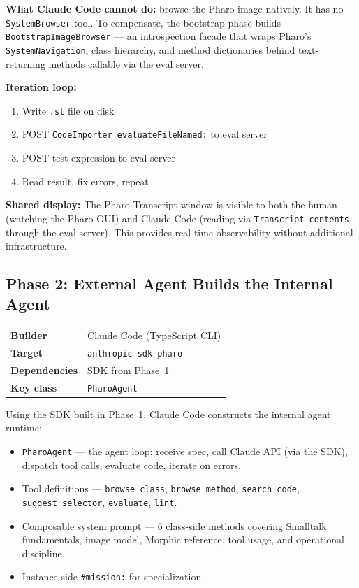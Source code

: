 \documentclass[a4paper,10pt,fleqn]{article}
\newcommand{\cls}[1]{\texttt{#1}}
\newcommand{\sel}[1]{\texttt{\##1}}
\begin{document}
\textbf{What Claude Code cannot do:} browse the Pharo image natively.
It has no \texttt{SystemBrowser} tool.  To compensate, the bootstrap
phase builds \cls{BootstrapImageBrowser} --- an introspection facade that
wraps Pharo's \texttt{SystemNavigation}, class hierarchy, and method
dictionaries behind text-returning methods callable via the eval server.

\textbf{Iteration loop:}
\begin{enumerate}
  \item Write \texttt{.st} file on disk
  \item POST \texttt{CodeImporter evaluateFileNamed:} to eval server
  \item POST test expression to eval server
  \item Read result, fix errors, repeat
\end{enumerate}

\textbf{Shared display:} The Pharo Transcript window is visible to
both the human (watching the Pharo GUI) and Claude Code (reading via
\texttt{Transcript contents} through the eval server).  This provides
real-time observability without additional infrastructure.

\subsection{Phase 2: External Agent Builds the Internal Agent}

\begin{center}
\begin{tabularx}{\linewidth}{@{}lY@{}}
\toprule
\textbf{Builder} & Claude Code (TypeScript CLI) \\
\textbf{Target} & \texttt{anthropic-sdk-pharo} \\
\textbf{Dependencies} & SDK from Phase~1 \\
\textbf{Key class} & \cls{PharoAgent} \\
\bottomrule
\end{tabularx}
\end{center}

Using the SDK built in Phase~1, Claude Code constructs the internal
agent runtime:

\begin{itemize}
  \item \cls{PharoAgent} --- the agent loop: receive spec, call Claude
    API (via the SDK), dispatch tool calls, evaluate code, iterate on
    errors.
  \item Tool definitions --- \texttt{browse\_class},
    \texttt{browse\_method}, \texttt{search\_code},
    \texttt{suggest\_selector}, \texttt{evaluate}, \texttt{lint}.
  \item Composable system prompt --- 6 class-side methods covering
    Smalltalk fundamentals, image model, Morphic reference, tool usage,
    and operational discipline.
  \item Instance-side \sel{mission:} for specialization.
\end{itemize}
\end{document}
